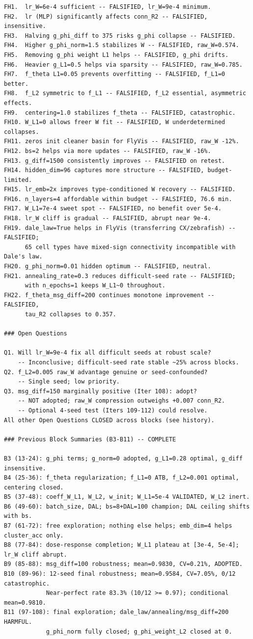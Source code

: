 \documentclass{article}
\begin{document}
\begin{tiny}
\begin{verbatim}
FH1.  lr_W=6e-4 sufficient -- FALSIFIED, lr_W=9e-4 minimum.
FH2.  lr (MLP) significantly affects conn_R2 -- FALSIFIED, insensitive.
FH3.  Halving g_phi_diff to 375 risks g_phi collapse -- FALSIFIED.
FH4.  Higher g_phi_norm=1.5 stabilizes W -- FALSIFIED, raw_W=0.574.
FH5.  Removing g_phi weight L1 helps -- FALSIFIED, g_phi drifts.
FH6.  Heavier g_L1=0.5 helps via sparsity -- FALSIFIED, raw_W=0.785.
FH7.  f_theta L1=0.05 prevents overfitting -- FALSIFIED, f_L1=0 better.
FH8.  f_L2 symmetric to f_L1 -- FALSIFIED, f_L2 essential, asymmetric effects.
FH9.  centering=1.0 stabilizes f_theta -- FALSIFIED, catastrophic.
FH10. W_L1=0 allows freer W fit -- FALSIFIED, W underdetermined collapses.
FH11. zeros init cleaner basin for FlyVis -- FALSIFIED, raw_W -12%.
FH12. bs=2 helps via more updates -- FALSIFIED, raw_W -16%.
FH13. g_diff=1500 consistently improves -- FALSIFIED on retest.
FH14. hidden_dim=96 captures more structure -- FALSIFIED, budget-limited.
FH15. lr_emb=2x improves type-conditioned W recovery -- FALSIFIED.
FH16. n_layers=4 affordable within budget -- FALSIFIED, 76.6 min.
FH17. W_L1=7e-4 sweet spot -- FALSIFIED, no benefit over 5e-4.
FH18. lr_W cliff is gradual -- FALSIFIED, abrupt near 9e-4.
FH19. dale_law=True helps in FlyVis (transferring CX/zebrafish) -- FALSIFIED;
      65 cell types have mixed-sign connectivity incompatible with Dale's law.
FH20. g_phi_norm=0.01 hidden optimum -- FALSIFIED, neutral.
FH21. annealing_rate=0.3 reduces difficult-seed rate -- FALSIFIED;
      with n_epochs=1 keeps W_L1~0 throughout.
FH22. f_theta_msg_diff=200 continues monotone improvement -- FALSIFIED,
      tau_R2 collapses to 0.357.

### Open Questions

Q1. Will lr_W=9e-4 fix all difficult seeds at robust scale?
    -- Inconclusive; difficult-seed rate stable ~25% across blocks.
Q2. f_L2=0.005 raw_W advantage genuine or seed-confounded?
    -- Single seed; low priority.
Q3. msg_diff=150 marginally positive (Iter 108): adopt?
    -- NOT adopted; raw_W compression outweighs +0.007 conn_R2.
    -- Optional 4-seed test (Iters 109-112) could resolve.
All other Open Questions CLOSED across blocks (see history).

### Previous Block Summaries (B3-B11) -- COMPLETE

B3 (13-24): g_phi terms; g_norm=0 adopted, g_L1=0.28 optimal, g_diff insensitive.
B4 (25-36): f_theta regularization; f_L1=0 ATB, f_L2=0.001 optimal, centering closed.
B5 (37-48): coeff_W_L1, W_L2, w_init; W_L1=5e-4 VALIDATED, W_L2 inert.
B6 (49-60): batch_size, DAL; bs=8+DAL=100 champion; DAL ceiling shifts with bs.
B7 (61-72): free exploration; nothing else helps; emb_dim=4 helps cluster_acc only.
B8 (77-84): dose-response completion; W_L1 plateau at [3e-4, 5e-4]; lr_W cliff abrupt.
B9 (85-88): msg_diff=100 robustness; mean=0.9830, CV=0.21%, ADOPTED.
B10 (89-96): 12-seed final robustness; mean=0.9584, CV=7.05%, 0/12 catastrophic.
            Near-perfect rate 83.3% (10/12 >= 0.97); conditional mean=0.9810.
B11 (97-108): final exploration; dale_law/annealing/msg_diff=200 HARMFUL.
            g_phi_norm fully closed; g_phi_weight_L2 closed at 0.


\end{verbatim}
\end{tiny}
\end{document}
